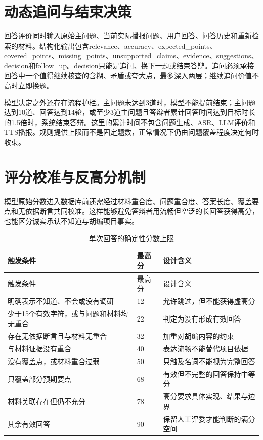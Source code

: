 \section{动态追问与结束决策}
回答评价同时输入原始主问题、当前实际播报问题、用户回答、问答历史和重新检索的材料。结构化输出包含relevance、accuracy、expected\_points、covered\_points、missing\_points、unsupported\_claims、evidence、suggestions、decision和follow\_up。decision只能是追问、换下一题或结束答辩。追问必须承接回答中一个值得继续核查的含糊、矛盾或夸大点，最多深入两层；继续追问价值不高时立即换题。

模型决定之外还存在流程护栏。主问题未达到3道时，模型不能提前结束；主问题达到10道、回答达到14轮，或至少3道主问题且答辩者累计回答时间达到目标时长的1.5倍时，系统结束答辩。这里的累计时间不包含问题生成、ASR、LLM评价和TTS播报。规则提供上限而不是固定题数，正常情况下仍由问题覆盖程度决定何时收束。

\section{评分校准与反高分机制}
模型原始分数进入数据库前还需经过材料重合度、问题重合度、答案长度、覆盖要点和无依据断言共同校准。这样能够避免答辩者用流畅但空泛的长回答获得高分，也能区分诚实承认不知道与胡编项目事实。

\begin{longtable}{p{6.2cm}p{2.5cm}p{5.4cm}}
\caption{单次回答的确定性分数上限}\\
\toprule 触发条件 & 最高分 & 设计含义 \\
\midrule
\endfirsthead
\toprule 触发条件 & 最高分 & 设计含义 \\
\midrule
\endhead
明确表示不知道、不会或没有调研 & 12 & 允许跳过，但不能获得虚高分 \\
少于15个有效字符，或与问题和材料均无重合 & 22 & 判定为没有形成有效回答 \\
存在无依据断言且与材料无重合 & 32 & 加重对胡编内容的约束 \\
与材料证据没有重合 & 40 & 表达流畅不能替代项目依据 \\
没有覆盖点，或材料重合过弱 & 50 & 只触及名词不能视为完整回答 \\
只覆盖部分预期要点 & 68 & 有效但不完整的回答保持中等分 \\
材料关联存在但仍不充分 & 78 & 高分要求具体实现、结果与边界 \\
其余有效回答 & 90 & 保留人工评委才能判断的满分空间 \\
\bottomrule
\end{longtable}

